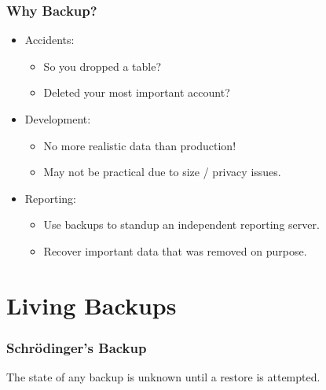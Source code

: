 \begin{frame}
    \frametitle{Why Backup?}

    \begin{itemize}
        \item Accidents:

        \begin{itemize}
            \item So you dropped a table?\pause
            \item Deleted your most important account?\pause
        \end{itemize}

        \item Development:

        \begin{itemize}
            \item No more realistic data than production!\pause
            \item May not be practical due to size / privacy issues.\pause
        \end{itemize}

        \item Reporting:

        \begin{itemize}
            \item Use backups to standup an independent reporting server.\pause
            \item Recover important data that was removed on purpose.
        \end{itemize}
    \end{itemize}
\end{frame}

\section{Living Backups}

\begin{frame}
    \frametitle{Schr\"{o}dinger’s Backup}

    The state of any backup is unknown until a restore is attempted.
\end{frame}

